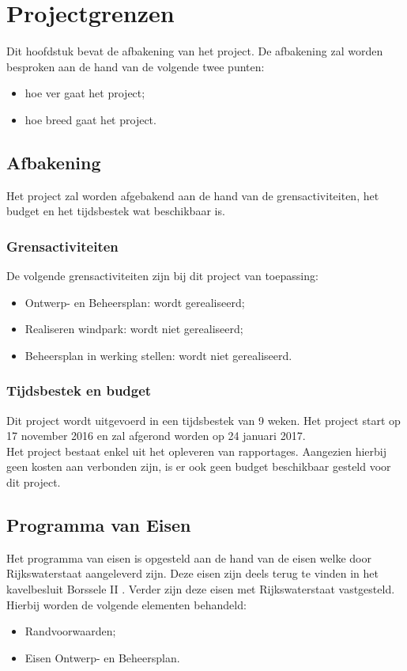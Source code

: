 \documentclass[numbers=endperiod]{scrartcl}
\newcommand{\sectionSmall}[1]{
	\vspace{-10pt}
	\section{#1}
	\vspace{-5pt}
}
\newcommand{\whitespace}{\vspace*{2 mm} \\}%
\begin{document}
	\sectionSmall{Projectgrenzen}
	Dit hoofdstuk bevat de afbakening van het project. De afbakening zal worden besproken aan de hand van de volgende twee punten:
	\begin{itemize}[noitemsep]
		\item hoe ver gaat het project;
		\item hoe breed gaat het project.
	\end{itemize}
	\subsection{Afbakening}
	Het project zal worden afgebakend aan de hand van de grensactiviteiten, het budget en het tijdsbestek wat beschikbaar is.
	\subsubsection{Grensactiviteiten}
	De volgende grensactiviteiten zijn bij dit project van toepassing:
	\begin{itemize}
		\item Ontwerp- en Beheersplan: wordt gerealiseerd;
		\item Realiseren windpark: wordt niet gerealiseerd;
		\item Beheersplan in werking stellen: wordt niet gerealiseerd.
	\end{itemize}
	\subsubsection{Tijdsbestek en budget}
	Dit project wordt uitgevoerd in een tijdsbestek van 9 weken. Het project start op 17 november 2016 en zal afgerond worden op 24 januari 2017.
	\whitespace
	Het project bestaat enkel uit het opleveren van rapportages. Aangezien hierbij geen kosten aan verbonden zijn, is er ook geen budget beschikbaar gesteld voor dit project.
	\subsection{Programma van Eisen}
	Het programma van eisen is opgesteld aan de hand van de eisen welke door Rijkswaterstaat aangeleverd zijn. Deze eisen zijn deels terug te vinden in het kavelbesluit Borssele II \cite{Kavelbesluit:2015:Online}. Verder zijn deze eisen met Rijkswaterstaat vastgesteld.
	\whitespace
	Hierbij worden de volgende elementen behandeld:
	\begin{itemize}[noitemsep]
		\item Randvoorwaarden;
		\item Eisen Ontwerp- en Beheersplan.
	\end{itemize}
\end{document}
